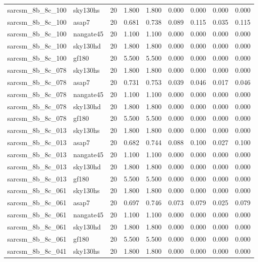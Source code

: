 \begin{tabular}{llrrrrrrr}
sarcsm\_8b\_8c\_100 & sky130hs & 20 & 1.800 & 1.800 & 0.000 & 0.000 & 0.000 & 0.000 \\
sarcsm\_8b\_8c\_100 & asap7 & 20 & 0.681 & 0.738 & 0.089 & 0.115 & 0.035 & 0.115 \\
sarcsm\_8b\_8c\_100 & nangate45 & 20 & 1.100 & 1.100 & 0.000 & 0.000 & 0.000 & 0.000 \\
sarcsm\_8b\_8c\_100 & sky130hd & 20 & 1.800 & 1.800 & 0.000 & 0.000 & 0.000 & 0.000 \\
sarcsm\_8b\_8c\_100 & gf180 & 20 & 5.500 & 5.500 & 0.000 & 0.000 & 0.000 & 0.000 \\
sarcsm\_8b\_8c\_078 & sky130hs & 20 & 1.800 & 1.800 & 0.000 & 0.000 & 0.000 & 0.000 \\
sarcsm\_8b\_8c\_078 & asap7 & 20 & 0.731 & 0.753 & 0.039 & 0.046 & 0.017 & 0.046 \\
sarcsm\_8b\_8c\_078 & nangate45 & 20 & 1.100 & 1.100 & 0.000 & 0.000 & 0.000 & 0.000 \\
sarcsm\_8b\_8c\_078 & sky130hd & 20 & 1.800 & 1.800 & 0.000 & 0.000 & 0.000 & 0.000 \\
sarcsm\_8b\_8c\_078 & gf180 & 20 & 5.500 & 5.500 & 0.000 & 0.000 & 0.000 & 0.000 \\
sarcsm\_8b\_8c\_013 & sky130hs & 20 & 1.800 & 1.800 & 0.000 & 0.000 & 0.000 & 0.000 \\
sarcsm\_8b\_8c\_013 & asap7 & 20 & 0.682 & 0.744 & 0.088 & 0.100 & 0.027 & 0.100 \\
sarcsm\_8b\_8c\_013 & nangate45 & 20 & 1.100 & 1.100 & 0.000 & 0.000 & 0.000 & 0.000 \\
sarcsm\_8b\_8c\_013 & sky130hd & 20 & 1.800 & 1.800 & 0.000 & 0.000 & 0.000 & 0.000 \\
sarcsm\_8b\_8c\_013 & gf180 & 20 & 5.500 & 5.500 & 0.000 & 0.000 & 0.000 & 0.000 \\
sarcsm\_8b\_8c\_061 & sky130hs & 20 & 1.800 & 1.800 & 0.000 & 0.000 & 0.000 & 0.000 \\
sarcsm\_8b\_8c\_061 & asap7 & 20 & 0.697 & 0.746 & 0.073 & 0.079 & 0.025 & 0.079 \\
sarcsm\_8b\_8c\_061 & nangate45 & 20 & 1.100 & 1.100 & 0.000 & 0.000 & 0.000 & 0.000 \\
sarcsm\_8b\_8c\_061 & sky130hd & 20 & 1.800 & 1.800 & 0.000 & 0.000 & 0.000 & 0.000 \\
sarcsm\_8b\_8c\_061 & gf180 & 20 & 5.500 & 5.500 & 0.000 & 0.000 & 0.000 & 0.000 \\
sarcsm\_8b\_8c\_041 & sky130hs & 20 & 1.800 & 1.800 & 0.000 & 0.000 & 0.000 & 0.000 \\

\end{tabular}
